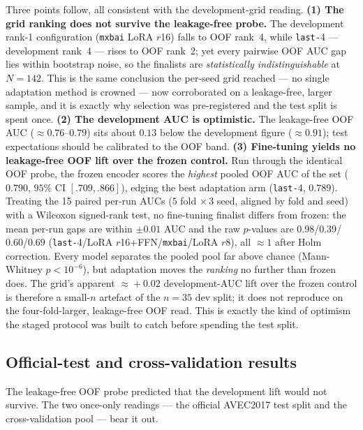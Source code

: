 \documentclass[conference]{IEEEtran}
\begin{document}
Three points follow, all consistent with the development-grid reading.
\textbf{(1) The grid ranking does not survive the leakage-free probe.} The
development rank-1 configuration (\texttt{mxbai} LoRA $r$16) falls to OOF rank~4,
while \texttt{last-}4 --- development rank~4 --- rises to OOF rank~2; yet every
pairwise OOF AUC gap lies within bootstrap noise, so the finalists are
\emph{statistically indistinguishable} at $N\!=\!142$. This is the same
conclusion the per-seed grid reached --- no single adaptation method is crowned
--- now corroborated on a leakage-free, larger sample, and it is
exactly why selection was pre-registered and the test split is spent once.
\textbf{(2) The development AUC is optimistic.} The leakage-free OOF AUC
($\approx\!0.76$--$0.79$) sits about $0.13$ below the development figure
($\approx\!0.91$); test expectations should be calibrated to the OOF band.
\textbf{(3) Fine-tuning yields no leakage-free OOF lift over the frozen
control.} Run through the identical OOF probe, the frozen encoder scores the
\emph{highest} pooled OOF AUC of the set ($0.790$, $95\%$ CI $[.709,.866]$),
edging the best adaptation arm (\texttt{last-}4, $0.789$). Treating the 15 paired
per-run AUCs ($5$ fold $\times\,3$ seed, aligned by fold and seed) with a
Wilcoxon signed-rank test, no fine-tuning finalist differs from frozen: the
mean per-run gaps are within $\pm0.01$ AUC and the raw $p$-values are
$0.98$/$0.39$/$0.60$/$0.69$ (\texttt{last-}4/LoRA $r$16+FFN/\texttt{mxbai}/LoRA
$r$8), all $\approx\!1$ after Holm correction. Every model separates the pooled
pool far above chance (Mann-Whitney $p<10^{-6}$), but adaptation moves the
\emph{ranking} no further than frozen does. The grid's apparent $\approx\!+0.02$
development-AUC lift over the frozen control is therefore a small-$n$ artefact of
the $n\!=\!35$ dev split; it does not reproduce on the four-fold-larger,
leakage-free OOF read. This is exactly the kind of optimism the staged protocol
was built to catch before spending the test split.

\subsection{Official-test and cross-validation results}
\label{sec:finetune-iter1-test}

The leakage-free OOF probe predicted that the development lift would not survive.
The two once-only readings --- the official AVEC2017 test split and the
cross-validation pool --- bear it out.
\end{document}
